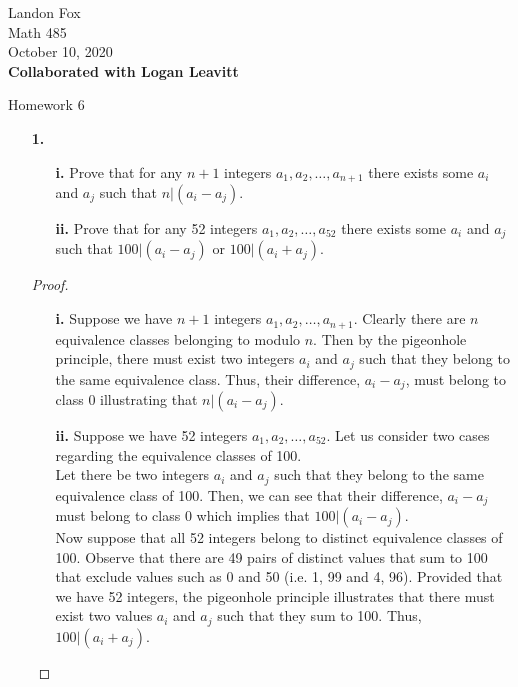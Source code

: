 \documentclass[ 12pt ]{article}
\begin{document}
\noindent Landon Fox \\
\noindent Math 485 \\
\noindent October 10, 2020 \\
\noindent \textbf{Collaborated with Logan Leavitt}

\begin{center}
	\Large Homework 6
\end{center}

\begin{enumerate}
	\item[\textbf{1.}]
		\begin{enumerate}
			\item[\textbf{i.}] Prove that for any $n + 1$ integers $a_1, a_2, \hdots, a_{n+1}$ there exists some $a_i$ and $a_j$ such that $n|(a_i - a_j)$.
			\item[\textbf{ii.}] Prove that for any 52 integers $a_1, a_2, \hdots, a_{52}$ there exists some $a_i$ and $a_j$ such that $100|(a_i - a_j)$ or $100|(a_i + a_j)$.
		\end{enumerate}

		\begin{proof}
			\begin{enumerate}
				\item[\textbf{i.}] Suppose we have $n+1$ integers $a_1, a_2, \hdots, a_{n+1}$. Clearly there are $n$ equivalence classes belonging to modulo $n$. Then by the pigeonhole
					principle, there must exist two integers $a_i$ and $a_j$ such that they belong to the same equivalence class. Thus, their difference, $a_i - a_j$, must belong to
					class 0 illustrating that $n | (a_i - a_j)$.

				\item[\textbf{ii.}] Suppose we have 52 integers $a_1, a_2, \hdots, a_{52}$. Let us consider two cases regarding the equivalence classes of 100. \\
					Let there be two integers $a_i$ and $a_j$ such that they belong to the same equivalence class of 100. Then, we can see that their difference, $a_i - a_j$ must
					belong to class 0 which implies that $100 | (a_i - a_j)$. \\
					Now suppose that all 52 integers belong to distinct equivalence classes of 100. Observe that there are 49 pairs of distinct values that sum to 100 that exclude values
					such as 0 and 50 (i.e. 1, 99 and 4, 96). Provided that we have 52 integers, the pigeonhole principle illustrates that there must exist two values $a_i$ and $a_j$ such
					that they sum to 100. Thus, $100 | (a_i + a_j)$.
			\end{enumerate}
		\end{proof}



\end{enumerate}
\end{document}

